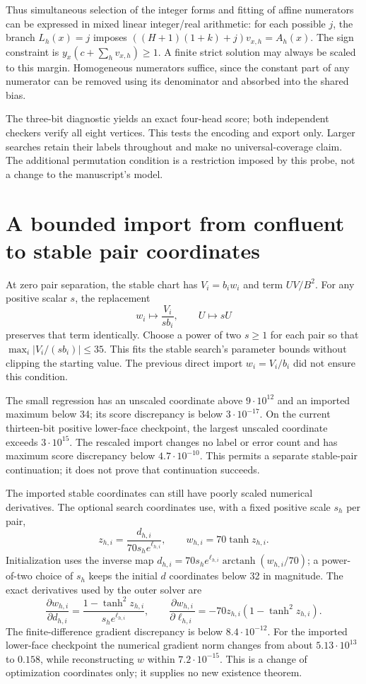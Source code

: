 \documentclass[11pt]{article}
\begin{document}
Thus simultaneous selection of the integer forms and fitting of affine
numerators can be expressed in mixed linear integer/real arithmetic:
for each possible $j$, the branch $L_h(x)=j$ imposes
$((H+1)(1+k)+j)v_{x,h}=A_h(x)$. The sign constraint is
$y_x(c+\sum_h v_{x,h})\ge1$. A finite strict solution may always be
scaled to this margin. Homogeneous numerators suffice, since the
constant part of any numerator can be removed using its denominator
and absorbed into the shared bias.

The three-bit diagnostic yields an exact four-head score; both
independent checkers verify all eight vertices. This tests the encoding
and export only. Larger searches retain their labels throughout and
make no universal-coverage claim. The additional permutation condition
is a restriction imposed by this probe, not a change to the manuscript's
model.


\section{A bounded import from confluent to stable pair coordinates}

At zero pair separation, the stable chart has $V_i=b_iw_i$ and term
$UV/B^2$. For any positive scalar $s$, the replacement
\[
 w_i\longmapsto\frac{V_i}{s b_i},\qquad U\longmapsto sU
\]
preserves that term identically. Choose a power of two $s\ge1$ for
each pair so that $\max_i|V_i/(s b_i)|\le35$. This fits the stable
search's parameter bounds without clipping the starting value. The
previous direct import $w_i=V_i/b_i$ did not ensure this condition.

The small regression has an unscaled coordinate above $9\cdot10^{12}$
and an imported maximum below 34; its score discrepancy is below
$3\cdot10^{-17}$. On the current thirteen-bit positive lower-face
checkpoint, the largest unscaled coordinate exceeds $3\cdot10^{15}$.
The rescaled import changes no label or error count and has maximum
score discrepancy below $4.7\cdot10^{-10}$. This permits a separate
stable-pair continuation; it does not prove that continuation succeeds.


The imported stable coordinates can still have poorly scaled numerical
derivatives. The optional search coordinates use, with a fixed positive
scale $s_h$ per pair,
\[
 z_{h,i}=\frac{d_{h,i}}{70s_h e^{\ell_{h,i}}},\qquad
 w_{h,i}=70\tanh z_{h,i}.
\]
Initialization uses the inverse map
$d_{h,i}=70s_h e^{\ell_{h,i}}\operatorname{arctanh}(w_{h,i}/70)$;
a power-of-two choice of $s_h$ keeps the initial $d$ coordinates below
32 in magnitude. The exact derivatives used by the outer solver are
\[
 \frac{\partial w_{h,i}}{\partial d_{h,i}}
 =\frac{1-\tanh^2 z_{h,i}}{s_h e^{\ell_{h,i}}},\qquad
 \frac{\partial w_{h,i}}{\partial\ell_{h,i}}
 =-70z_{h,i}(1-\tanh^2 z_{h,i}).
\]
The finite-difference gradient discrepancy is below $8.4\cdot10^{-12}$.
For the imported lower-face checkpoint the numerical gradient norm
changes from about $5.13\cdot10^{13}$ to $0.158$, while reconstructing
$w$ within $7.2\cdot10^{-15}$. This is a change of optimization
coordinates only; it supplies no new existence theorem.
\end{document}
